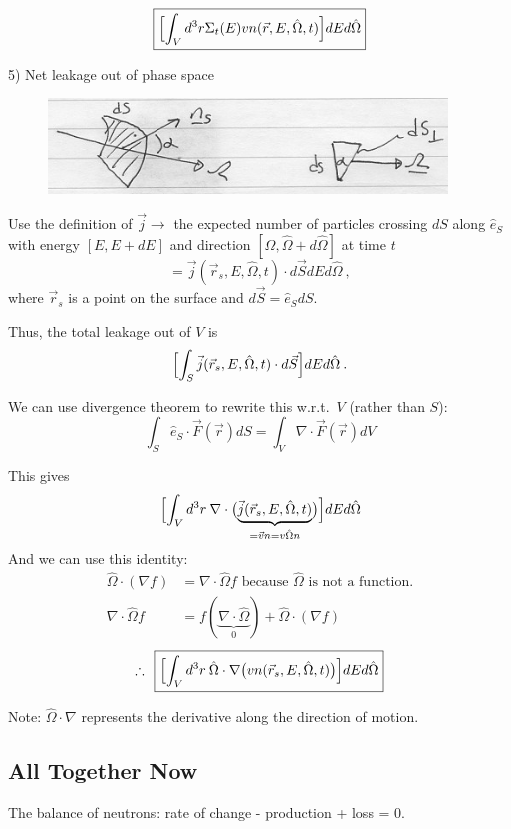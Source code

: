 \documentclass[12pt]{article}
\newcommand{\vOmega}{\ensuremath{\hat{\Omega}}}
\begin{document}
\[\boxed{\Bigl[\int_V d^3r \Sigma_t(E) v n(\vec{r}, E, \vOmega, t) \Bigr] dE d\vOmega }\]

5) Net leakage out of phase space

\begin{figure}[h!]
\begin{center}
\includegraphics[height=1in]{../figs/DifferentialArea}
\end{center}
\end{figure}

Use the definition of $\vec{j} \rightarrow$ the expected number of particles crossing $dS$ along $\hat{e}_S$ with energy $[E, E + dE]$ and direction $[\vOmega, \vOmega + d\vOmega]$ at time $t$  
%
\[= \vec{j}(\vec{r}_s, E, \vOmega, t) \cdot d\vec{S} dE d\vOmega\:,\]
%
where $\vec{r}_s$ is a point on the surface and $d\vec{S} = \hat{e}_S dS$.

Thus, the total leakage out of $V$ is
\[\Bigl[\int_S \vec{j}(\vec{r}_s, E, \vOmega, t) \cdot d\vec{S} \Bigr] dE d\vOmega\:. \]

We can use divergence theorem to rewrite this w.r.t.\ $V$ (rather than $S$):
\[\int_S \hat{e}_S \cdot \vec{F} (\vec{r}) dS = \int_V \nabla \cdot \vec{F} (\vec{r}) dV\]

This gives
\[\Bigl[\int_V d^3r \: \nabla \cdot \bigl( \underbrace{\vec{j}(\vec{r}_s, E, \vOmega, t)}_{=\vec{v}n = v \vOmega n} \bigr) \Bigr] dE d\vOmega \]
%
And we can use this identity:
\begin{align}
%
\vOmega \cdot (\nabla f) &= \nabla \cdot \vOmega f \text{ because }\vOmega\text{ is not a function.} \nonumber\\
\nabla \cdot \vOmega f &= f(\underbrace{\nabla \cdot \vOmega}_{0}) + \vOmega \cdot (\nabla f) \nonumber
\end{align}
%
\[\therefore \:\: \boxed{\Bigl[\int_V d^3r \: \vOmega \cdot \nabla \bigl(v n(\vec{r}_s, E, \vOmega, t) \bigr) \Bigr] dE d\vOmega }\]

Note: $\vOmega \cdot \nabla$ represents the derivative along the direction of motion.

\subsection*{All Together Now}
The balance of neutrons: rate of change - production + loss = 0.
\end{document}
